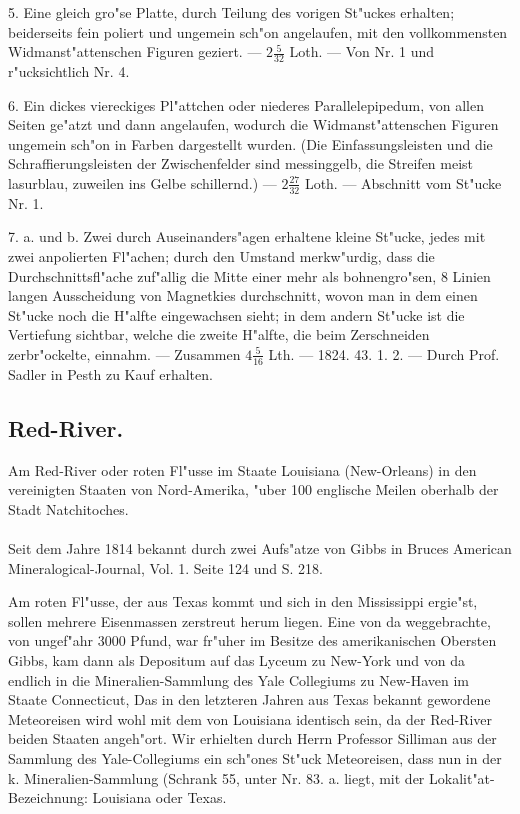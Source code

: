 \documentclass[a4paper, 11pt, oneside, polutonikogreek, german]{article}
\begin{document}
5. Eine gleich gro"se Platte, durch Teilung des vorigen St"uckes erhalten; beiderseits fein poliert und ungemein sch"on angelaufen, mit den vollkommensten Widmanst"attenschen Figuren geziert. --- $2\frac{5}{32}$ Loth. --- Von Nr. 1 und r"ucksichtlich Nr. 4.

6. Ein dickes viereckiges Pl"attchen oder niederes Parallelepipedum, von allen Seiten ge"atzt und dann angelaufen, wodurch die Widmanst"attenschen Figuren ungemein sch"on in Farben dargestellt wurden. (Die Einfassungsleisten und die Schraffierungsleisten der Zwischenfelder sind messinggelb, die Streifen meist lasurblau, zuweilen ins Gelbe schillernd.) --- $2\frac{27}{32}$ Loth. --- Abschnitt vom St"ucke Nr. 1.

7. a. und b. Zwei durch Auseinanders"agen erhaltene kleine St"ucke, jedes mit zwei anpolierten Fl"achen; durch den Umstand merkw"urdig, dass die Durchschnittsfl"ache zuf"allig die Mitte einer mehr als bohnengro"sen, 8 Linien langen Ausscheidung von Magnetkies durchschnitt, wovon man in dem einen St"ucke noch die H"alfte eingewachsen sieht; in dem andern St"ucke ist die Vertiefung sichtbar, welche die zweite H"alfte, die beim Zerschneiden zerbr"ockelte, einnahm. --- Zusammen $4\frac{5}{16}$ Lth. --- 1824. 43. 1. 2. --- Durch Prof. Sadler in Pesth zu Kauf erhalten.
\subsection{Red-River.}
\begin{center}
\small
Am Red-River oder roten Fl"usse im Staate Louisiana (New-Orleans) in den vereinigten Staaten von Nord-Amerika, "uber 100 englische Meilen oberhalb der Stadt Natchitoches.
\end{center}
\paragraph{}
Seit dem Jahre 1814 bekannt durch zwei Aufs"atze von Gibbs in Bruces American Mineralogical-Journal, Vol. 1. Seite 124 und S. 218.

\setlength{\leftskip}{10mm}
\setlength{\parindent}{0pt}

{\footnotesize Am roten Fl"usse, der aus Texas kommt und sich in den Mississippi ergie"st, sollen mehrere Eisenmassen zerstreut herum liegen. Eine von da weggebrachte, von ungef"ahr 3000 Pfund, war fr"uher im Besitze des amerikanischen Obersten Gibbs, kam dann als Depositum auf das Lyceum zu New-York und von da endlich in die Mineralien-Sammlung des Yale Collegiums zu New-Haven im Staate Connecticut, Das in den letzteren Jahren aus Texas bekannt gewordene Meteoreisen wird wohl mit dem von Louisiana identisch sein, da der Red-River beiden Staaten angeh"ort. Wir erhielten durch Herrn Professor Silliman aus der Sammlung des Yale-Collegiums ein sch"ones St"uck Meteoreisen, dass nun in der k. Mineralien-Sammlung (Schrank 55, unter Nr. 83. a. liegt, mit der Lokalit"at-Bezeichnung: Louisiana oder Texas.}
\end{document}

